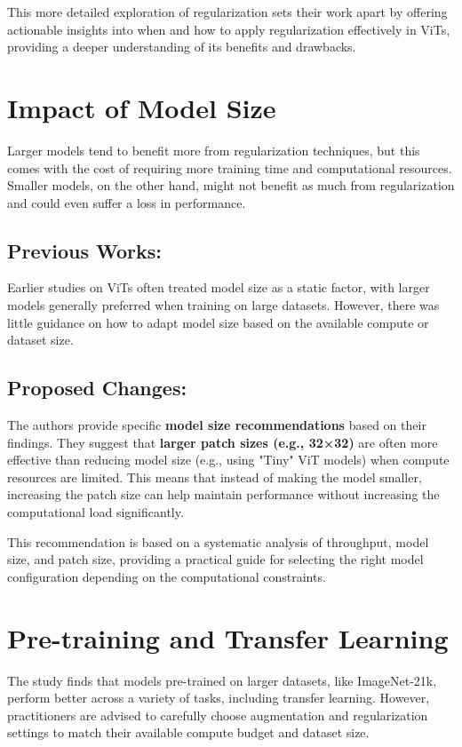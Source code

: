 \documentclass{report}
\begin{document}
	 
	 
	 This more detailed exploration of regularization sets their work apart by offering actionable insights into when and how to apply regularization effectively in ViTs, providing a deeper understanding of its benefits and drawbacks.
	 
	 
	 
	 
	 
	 
	 
	 
	 \section{Impact of Model Size}
	 Larger models tend to benefit more from regularization techniques, but this comes with the cost of requiring more training time and computational resources. Smaller models, on the other hand, might not benefit as much from regularization and could even suffer a loss in performance.
	 
	 \subsection{Previous Works:}
	 Earlier studies on ViTs often treated model size as a static factor, with larger models generally preferred when training on large datasets. However, there was little guidance on how to adapt model size based on the available compute or dataset size.
	 
	 
	 \subsection{Proposed Changes:}
	 The authors provide specific \textbf{model size recommendations} based on their findings. They suggest that \textbf{larger patch sizes (e.g., 32×32)} are often more effective than reducing model size (e.g., using "Tiny" ViT models) when compute resources are limited. This means that instead of making the model smaller, increasing the patch size can help maintain performance without increasing the computational load significantly.
	 
	 This recommendation is based on a systematic analysis of throughput, model size, and patch size, providing a practical guide for selecting the right model configuration depending on the computational constraints.
	
	
	
	
	
	
	
	
	
	
	\section{Pre-training and Transfer Learning}
	The study finds that models pre-trained on larger datasets, like ImageNet-21k, perform better across a variety of tasks, including transfer learning. However, practitioners are advised to carefully choose augmentation and regularization settings to match their available compute budget and dataset size.
	
\end{document}
